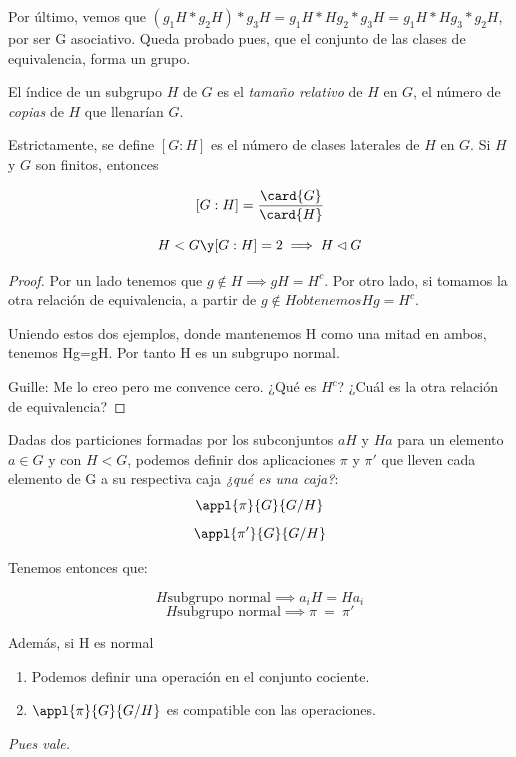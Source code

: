 \documentclass[nochap]{apuntes}
\begin{document}
  Por último, vemos que $(g_{1}H\ast g_{2}H)\ast g_{3}H=g_{1}H\ast Hg_{2}\ast g_{3}H=g_{1}H\ast Hg_{3}\ast g_{2}H$, por ser G asociativo. Queda probado pues, que el conjunto de las clases de equivalencia, forma un grupo.
  
\begin{defn}\label{defIndiceSG} El índice de un subgrupo $H$ de $G$ es el \textit{tamaño relativo} de $H$ en $G$, el número de \textit{copias} de $H$ que llenarían $G$.  

Estrictamente, se define $[G:H]$ es el número de clases laterales de $H$ en $G$. Si $H$ y $G$ son finitos, entonces 

\[ [G:H] = \frac{\card{G}}{\card{H}} \]
\end{defn}
  
  \begin{theorem}
   \[ H< G \y [G:H]=2 \implies H \lhd G \]
  \end{theorem}
  
  \begin{proof}
   Por un lado tenemos que $g\notin H \implies gH= H^{c}$. Por otro lado, si tomamos la otra relación de equivalencia, a partir de $g \notin H obtenemos Hg=H^{c}$.
   
   Uniendo estos dos ejemplos, donde mantenemos H como una mitad en ambos, tenemos Hg=gH. Por tanto H es un subgrupo normal.
   
   Guille: Me lo creo pero me convence cero. ¿Qué es $H^c$? ¿Cuál es la otra relación de equivalencia?
  \end{proof}
  
  \begin{lemma}
   Dadas dos particiones formadas por los subconjuntos $aH$ y $Ha$ para un elemento $a \in G$ y con $H <G$, podemos definir dos aplicaciones $\pi$ y $\pi '$ que lleven cada elemento de G a su respectiva caja \textit{¿qué es una caja?}:
   \[ \appl{\pi}{G}{G/H} \]
   \[ \appl{\pi'}{G}{G/H} \]
   
   Tenemos entonces que:
   
   \[ H \text{subgrupo normal} \implies a_iH = Ha_i \]
   \[ H \text{subgrupo normal} \implies \pi \ =\ \pi ' \]
   
   Además, si H es normal
   \begin{enumerate}
	\item Podemos definir una operación en el conjunto cociente.     
	\item $\appl{\pi}{G}{G/H}$ es compatible con las operaciones.
   \end{enumerate}
  \textit{Pues vale.}
  \end{lemma}
  
\end{document}
